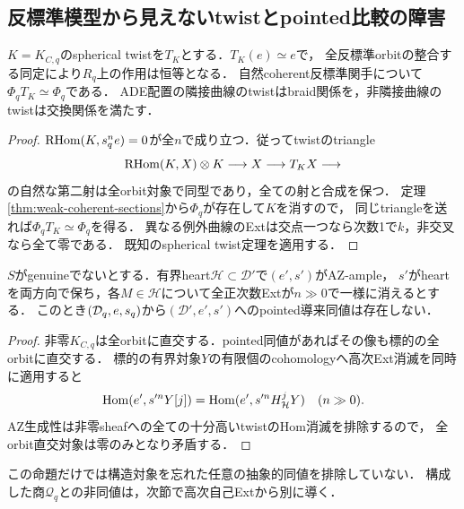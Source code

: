 \subsection{反標準模型から見えないtwistとpointed比較の障害}
\begin{corollary}[零指数twistの不可視性]\label{cor:zero-twist-invisible}
$K=K_{C,q}$のspherical twistを$T_K$とする．$T_K(e)\simeq e$で，
全反標準orbitの整合する同定により$R_q$上の作用は恒等となる．
自然coherent反標準関手について$\Phi_qT_K\simeq\Phi_q$である．
ADE配置の隣接曲線のtwistはbraid関係を，非隣接曲線のtwistは交換関係を満たす．
\end{corollary}
\begin{proof}
$\operatorname{RHom}(K,s_q^ne)=0$が全$n$で成り立つ．従ってtwistのtriangle
\[
 \operatorname{RHom}(K,X)\otimes K\longrightarrow X\longrightarrow T_KX\longrightarrow
\]
の自然な第二射は全orbit対象で同型であり，全ての射と合成を保つ．
定理\ref{thm:weak-coherent-sections}から$\Phi_q$が存在して$K$を消すので，
同じtriangleを送れば$\Phi_qT_K\simeq\Phi_q$を得る．
異なる例外曲線のExtは交点一つなら次数1で$k$，非交叉なら全て零である．
既知のspherical twist定理\cite[Propositions 2.10, 2.12--2.13]{SeidelThomasWalls}を適用する．
\end{proof}

\begin{proposition}[ampleな標準模型へのpointed同値はない]\label{prop:zero-pointed-obstruction}
$S$がgenuineでないとする．有界heart$\mathcal H\subset\mathcal D'$で$(e',s')$がAZ-ample，
$s'$がheartを両方向で保ち，各$M\in\mathcal H$について全正次数Extが$n\gg0$で一様に消えるとする．
このとき$(\mathcal D_q,e,s_q)$から$(\mathcal D',e',s')$へのpointed導来同値は存在しない．
\end{proposition}
\begin{proof}
非零$K_{C,q}$は全orbitに直交する．pointed同値があればその像も標的の全orbitに直交する．
標的の有界対象$Y$の有限個のcohomologyへ高次Ext消滅を同時に適用すると
\[
 \operatorname{Hom}(e',s'^nY[j])=\operatorname{Hom}(e',s'^nH^j_{\mathcal H}Y)\quad(n\gg0).
\]
AZ生成性は非零sheafへの全ての十分高いtwistのHom消滅を排除するので，
全orbit直交対象は零のみとなり矛盾する．
\end{proof}
この命題だけでは構造対象を忘れた任意の抽象的同値を排除していない．
構成した商$\mathcal Q_q$との非同値は，次節で高次自己Extから別に導く．

